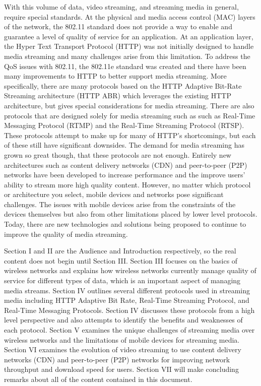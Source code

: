 \documentclass[12pt]{article}
\begin{document}
With this volume of data, video streaming, and streaming media in general, require special standards.  At the physical and media access control (MAC) layers of the network, the 802.11 standard does not provide a way to enable and guarantee a level of quality of service for an application. At an application layer, the Hyper Text Transport Protocol (HTTP) was not initially designed to handle media streaming and many challenges arise from this limitation.  To address the QoS issues with 802.11, the 802.11e standard was created and there have been many improvements to HTTP to better support media streaming.  More specifically, there are many protocols based on the HTTP Adaptive Bit-Rate Streaming architecture (HTTP ABR) which leverages the existing HTTP architecture, but gives special considerations for media streaming.  There are also protocols that are designed solely for media streaming such as  such as Real-Time Messaging Protocol (RTMP) and the Real-Time Streaming Protocol (RTSP).  These protocols attempt to make up for many of HTTP's shortcomings, but each of these still have significant downsides.  The demand for media streaming has grown so great though, that these protocols are not enough.  Entirely new architectures such as content delivery networks (CDN) and peer-to-peer (P2P) networks have been developed to increase performance and the improve users' ability to stream more high quality content.  However, no matter which protocol or architecture you select, mobile devices and networks pose significant challenges.  The issues with mobile devices arise from the constraints of the devices themselves but also from other limitations placed by lower level protocols.  Today, there are new technologies and solutions being proposed to continue to improve the quality of media streaming.

Section I and II are the Audience and Introduction respectively, so the real content does not begin until Section III.  Section III focuses on the basics of wireless networks and explains how wireless networks currently manage quality of service for different types of data, which is an important aspect of managing media streams.  Section IV outlines several different protocols used in streaming media including HTTP Adaptive Bit Rate, Real-Time Streaming Protocol, and Real-Time Messaging Protocols.  Section IV discusses these protocols from a high level perspective and also attempts to identify the benefits and weaknesses of each protocol.  Section V examines the unique challenges of streaming media over wireless networks and the limitations of mobile devices for streaming media.  Section VI examines the evolution of video streaming to use content delivery networks (CDN) and peer-to-peer (P2P) networks for improving network throughput and download speed for users.  Section VII will make concluding remarks about all of the content contained in this document.
\end{document}

